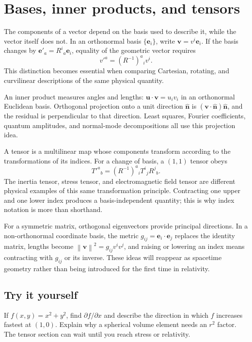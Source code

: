 \documentclass[11pt,oneside]{book}
\newcommand{\vect}[1]{\boldsymbol{#1}}
\newcommand{\norm}[1]{\left\lVert #1\right\rVert}
\theoremstyle{reviewstyle}
\newcommand{\learningcheck}[1]{\subsection*{Try it yourself}\noindent #1\par}
\begin{document}
\section{Bases, inner products, and tensors}
The components of a vector depend on the basis used to describe it, while the vector itself does not. In an orthonormal basis $\{\vect e_i\}$, write $\vect v=v^i\vect e_i$. If the basis changes by $\vect e'_a=R^i{}_a\vect e_i$, equality of the geometric vector requires
\begin{equation}
v'^a=(R^{-1})^a{}_iv^i.
\end{equation}
This distinction becomes essential when comparing Cartesian, rotating, and curvilinear descriptions of the same physical quantity.

An inner product measures angles and lengths: $\vect u\cdot\vect v=u_i v_i$ in an orthonormal Euclidean basis. Orthogonal projection onto a unit direction $\hat{\vect n}$ is $(\vect v\cdot\hat{\vect n})\hat{\vect n}$, and the residual is perpendicular to that direction. Least squares, Fourier coefficients, quantum amplitudes, and normal-mode decompositions all use this projection idea.

A tensor is a multilinear map whose components transform according to the transformations of its indices. For a change of basis, a $(1,1)$ tensor obeys
\begin{equation}
T'^a{}_b=(R^{-1})^a{}_iT^i{}_jR^j{}_b.
\end{equation}
The inertia tensor, stress tensor, and electromagnetic field tensor are different physical examples of this same transformation principle. Contracting one upper and one lower index produces a basis-independent quantity; this is why index notation is more than shorthand.

For a symmetric matrix, orthogonal eigenvectors provide principal directions. In a non-orthonormal coordinate basis, the metric $g_{ij}=\vect e_i\cdot\vect e_j$ replaces the identity matrix, lengths become $\norm{\vect v}^2=g_{ij}v^iv^j$, and raising or lowering an index means contracting with $g_{ij}$ or its inverse. These ideas will reappear as spacetime geometry rather than being introduced for the first time in relativity.

\learningcheck{If $f(x,y)=x^2+y^2$, find $\partial f/\partial x$ and describe the direction in which $f$ increases fastest at $(1,0)$. Explain why a spherical volume element needs an $r^2$ factor. The tensor section can wait until you reach stress or relativity.}
\end{document}
